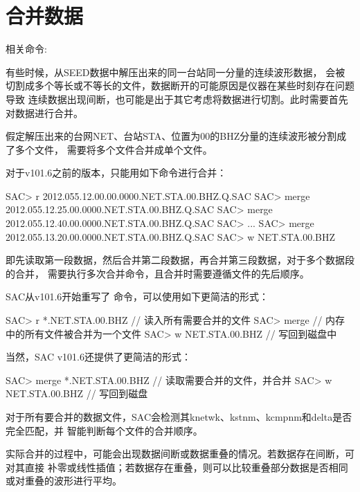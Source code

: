 \section{合并数据}
相关命令: 

有些时候，从SEED数据中解压出来的同一台站同一分量的连续波形数据，
会被切割成多个等长或不等长的文件，数据断开的可能原因是仪器在某些时刻存在问题导致
连续数据出现间断，也可能是出于其它考虑将数据进行切割。此时需要首先对数据进行合并。

假定解压出来的台网NET、台站STA、位置为00的BHZ分量的连续波形被分割成了多个文件，
需要将多个文件合并成单个文件。

对于v101.6之前的版本，只能用如下命令进行合并：
\begin{SACCode}
SAC> r 2012.055.12.00.00.0000.NET.STA.00.BHZ.Q.SAC
SAC> merge 2012.055.12.25.00.0000.NET.STA.00.BHZ.Q.SAC
SAC> merge 2012.055.12.40.00.0000.NET.STA.00.BHZ.Q.SAC
SAC> ...
SAC> merge 2012.055.13.20.00.0000.NET.STA.00.BHZ.Q.SAC
SAC> w NET.STA.00.BHZ
\end{SACCode}
即先读取第一段数据，然后合并第二段数据，再合并第三段数据，对于多个数据段的合并，
需要执行多次合并命令，且合并时需要遵循文件的先后顺序。

SAC从v101.6开始重写了  命令，可以使用如下更简洁的形式：
\begin{SACCode}
SAC> r *.NET.STA.00.BHZ        // 读入所有需要合并的文件
SAC> merge                     // 内存中的所有文件被合并为一个文件
SAC> w NET.STA.00.BHZ          // 写回到磁盘中
\end{SACCode}

当然，SAC v101.6还提供了更简洁的形式：
\begin{SACCode}
SAC> merge *.NET.STA.00.BHZ     // 读取需要合并的文件，并合并
SAC> w NET.STA.00.BHZ           // 写回到磁盘
\end{SACCode}

对于所有要合并的数据文件，SAC会检测其knetwk、kstnm、kcmpnm和delta是否完全匹配，并
智能判断每个文件的合并顺序。

实际合并的过程中，可能会出现数据间断或数据重叠的情况。若数据存在间断，可对其直接
补零或线性插值；若数据存在重叠，则可以比较重叠部分数据是否相同或对重叠的波形进行平均。
